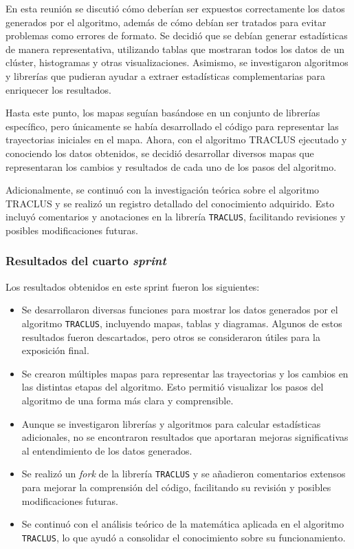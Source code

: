 En esta reunión se discutió cómo deberían ser expuestos correctamente los datos generados por el algoritmo, además de cómo debían ser tratados para evitar problemas como errores de formato. Se decidió que se debían generar estadísticas de manera representativa, utilizando tablas que mostraran todos los datos de un clúster, histogramas y otras visualizaciones. Asimismo, se investigaron algoritmos y librerías que pudieran ayudar a extraer estadísticas complementarias para enriquecer los resultados.

Hasta este punto, los mapas seguían basándose en un conjunto de librerías específico, pero únicamente se había desarrollado el código para representar las trayectorias iniciales en el mapa. Ahora, con el algoritmo TRACLUS ejecutado y conociendo los datos obtenidos, se decidió desarrollar diversos mapas que representaran los cambios y resultados de cada uno de los pasos del algoritmo.

Adicionalmente, se continuó con la investigación teórica sobre el algoritmo TRACLUS y se realizó un registro detallado del conocimiento adquirido. Esto incluyó comentarios y anotaciones en la librería \texttt{TRACLUS}, facilitando revisiones y posibles modificaciones futuras.

\subsubsection{Resultados del cuarto \textit{sprint}}

Los resultados obtenidos en este sprint fueron los siguientes:

\begin{itemize}
    \item Se desarrollaron diversas funciones para mostrar los datos generados por el algoritmo \texttt{TRACLUS}, incluyendo mapas, tablas y diagramas. Algunos de estos resultados fueron descartados, pero otros se consideraron útiles para la exposición final.
    
    \item Se crearon múltiples mapas para representar las trayectorias y los cambios en las distintas etapas del algoritmo. Esto permitió visualizar los pasos del algoritmo de una forma más clara y comprensible.
    
    \item Aunque se investigaron librerías y algoritmos para calcular estadísticas adicionales, no se encontraron resultados que aportaran mejoras significativas al entendimiento de los datos generados.
    
    \item Se realizó un \textit{fork} de la librería \texttt{TRACLUS} y se añadieron comentarios extensos para mejorar la comprensión del código, facilitando su revisión y posibles modificaciones futuras.
    
    \item Se continuó con el análisis teórico de la matemática aplicada en el algoritmo \texttt{TRACLUS}, lo que ayudó a consolidar el conocimiento sobre su funcionamiento.
\end{itemize}

